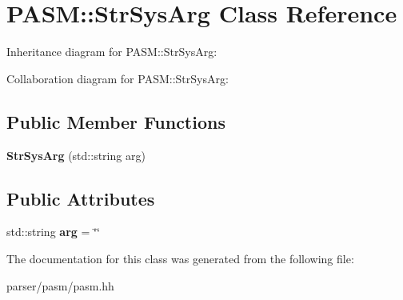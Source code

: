 \hypertarget{classPASM_1_1StrSysArg}{}\section{P\+A\+SM\+:\+:Str\+Sys\+Arg Class Reference}
\label{classPASM_1_1StrSysArg}


Inheritance diagram for P\+A\+SM\+:\+:Str\+Sys\+Arg\+:


Collaboration diagram for P\+A\+SM\+:\+:Str\+Sys\+Arg\+:
\subsection*{Public Member Functions}
\begin{DoxyCompactItemize}
\item 
\mbox{\label{classPASM_1_1StrSysArg_a3ee258f532acc1b796eb4f44e82cfad0}} 
{\bfseries Str\+Sys\+Arg} (std\+::string arg)
\end{DoxyCompactItemize}
\subsection*{Public Attributes}
\begin{DoxyCompactItemize}
\item 
\mbox{\label{classPASM_1_1StrSysArg_a8b7dde6eaa14b40b6281dcac0b5ab7b7}} 
std\+::string {\bfseries arg} = \char`\"{}\char`\"{}
\end{DoxyCompactItemize}


The documentation for this class was generated from the following file\+:\begin{DoxyCompactItemize}
\item 
parser/pasm/pasm.\+hh\end{DoxyCompactItemize}
